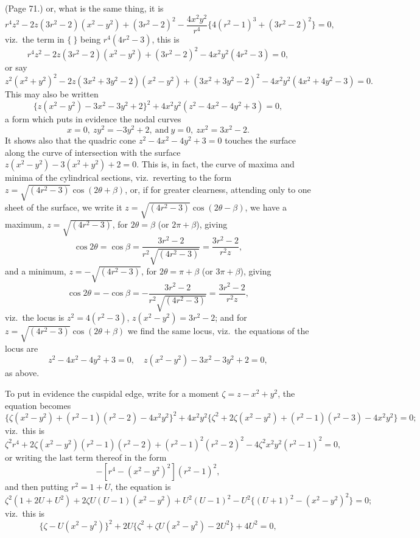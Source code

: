 \documentclass[11pt,a4paper]{article}
\begin{document}
\noindent (Page 71.) or, what is the same thing, it is
\[
r^4 z^2 - 2z(3r^2 - 2)(x^2 - y^2) + (3r^2 - 2)^2 - \frac{4x^2 y^2}{r^4}\{4(r^2 - 1)^3 + (3r^2 - 2)^2\} = 0,
\]
viz.\ the term in $\{\ \}$ being $r^4 (4r^2 - 3)$, this is
\[
r^4 z^2 - 2z(3r^2 - 2)(x^2 - y^2) + (3r^2 - 2)^2 - 4x^2 y^2 (4r^2 - 3) = 0,
\]
or say
\[
z^2 (x^2 + y^2)^2 - 2z(3x^2 + 3y^2 - 2)(x^2 - y^2) + (3x^2 + 3y^2 - 2)^2 - 4x^2 y^2 (4x^2 + 4y^2 - 3) = 0.
\]
This may also be written
\[
\{z(x^2 - y^2) - 3x^2 - 3y^2 + 2\}^2 + 4x^2 y^2 (z^2 - 4x^2 - 4y^2 + 3) = 0,
\]
a form which puts in evidence the nodal curves
\[
x = 0,\ zy^2 = -3y^2 + 2,\ \text{and}\ y = 0,\ zx^2 = 3x^2 - 2.
\]
It shows also that the quadric cone $z^2 - 4x^2 - 4y^2 + 3 = 0$ touches the surface along the curve of intersection with the surface $z(x^2 - y^2) - 3(x^2 + y^2) + 2 = 0$. This is, in fact, the curve of maxima and minima of the cylindrical sections, viz.\ reverting to the form $z = \sqrt{(4r^2 - 3)}\cos(2\theta + \beta)$, or, if for greater clearness, attending only to one sheet of the surface, we write it $z = \sqrt{(4r^2 - 3)}\cos(2\theta - \beta)$, we have a maximum, $z = \sqrt{(4r^2 - 3)}$, for $2\theta = \beta$ (or $2\pi + \beta$), giving
\[
\cos 2\theta = \cos\beta = \frac{3r^2 - 2}{r^2 \sqrt{(4r^2 - 3)}} = \frac{3r^2 - 2}{r^2 z},
\]
and a minimum, $z = -\sqrt{(4r^2 - 3)}$, for $2\theta = \pi + \beta$ (or $3\pi + \beta$), giving
\[
\cos 2\theta = -\cos\beta = -\frac{3r^2 - 2}{r^2 \sqrt{(4r^2 - 3)}} = \frac{3r^2 - 2}{r^2 z},
\]
viz.\ the locus is $z^2 = 4(r^2 - 3)$, $z(x^2 - y^2) = 3r^2 - 2$; and for $z = \sqrt{(4r^2 - 3)}\cos(2\theta + \beta)$ we find the same locus, viz.\ the equations of the locus are
\[
z^2 - 4x^2 - 4y^2 + 3 = 0,\quad z(x^2 - y^2) - 3x^2 - 3y^2 + 2 = 0,
\]
as above.

To put in evidence the cuspidal edge, write for a moment $\zeta = z - x^2 + y^2$, the equation becomes
\[
\{\zeta(x^2 - y^2) + (r^2 - 1)(r^2 - 2) - 4x^2 y^2\}^2 + 4x^2 y^2 \{\zeta^2 + 2\zeta(x^2 - y^2) + (r^2 - 1)(r^2 - 3) - 4x^2 y^2\} = 0;
\]
viz.\ this is
\[
\zeta^2 r^4 + 2\zeta(x^2 - y^2)(r^2 - 1)(r^2 - 2) + (r^2 - 1)^2 (r^2 - 2)^2 - 4\zeta^2 x^2 y^2 (r^2 - 1)^2 = 0,
\]
or writing the last term thereof in the form
\[
-[r^4 - (x^2 - y^2)^2](r^2 - 1)^2,
\]
and then putting $r^2 = 1 + U$, the equation is
\[
\zeta^2 (1 + 2U + U^2) + 2\zeta U(U - 1)(x^2 - y^2) + U^2 (U - 1)^2 - U^2 \{(U + 1)^2 - (x^2 - y^2)^2\} = 0;
\]
viz.\ this is
\[
\{\zeta - U(x^2 - y^2)\}^2 + 2U\{\zeta^2 + \zeta U (x^2 - y^2) - 2U^2\} + 4U^2 = 0,
\]

\bigskip
\end{document}
